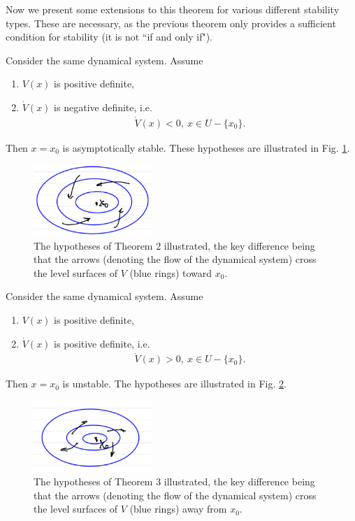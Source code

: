 Now we present some extensions to this theorem for various different stability types. These are necessary, as the previous theorem only provides a sufficient condition for stability (it is not ``if and only if").

\begin{theorem}[Theorem 2]
Consider the same dynamical system. Assume
\begin{enumerate}
	\item $V(x)$ is positive definite,
	\item $\dot{V}(x)$ is negative definite, i.e.
		\begin{align}
			\dot{V}(x) < 0,\ x\in U- \{x_0\}.
		\end{align}
\end{enumerate}
		Then $x=x_0$ is asymptotically stable. These hypotheses are illustrated in Fig. \ref{fig:lyap_thm2_hypos}.
\end{theorem}
\begin{figure}[h!]
	\centering
	\includegraphics[width=0.4\textwidth]{figures/ch2/24lyap_thm2_hypos.png}
	\caption{The hypotheses of Theorem 2 illustrated, the key difference being that the arrows (denoting the flow of the dynamical system) cross the level surfaces of $V$ (blue rings) toward $x_0$.}
	\label{fig:lyap_thm2_hypos}
\end{figure}

\begin{theorem}[Theorem 3]
	Consider the same dynamical system. Assume
	\begin{enumerate}
		\item $V(x)$ is positive definite,
		\item $\dot{V}(x)$ is positive definite, i.e.
		\begin{align}
			\dot{V}(x)>0,\ x\in U- \{x_0\}.
		\end{align}
	\end{enumerate}
	Then $x=x_0$ is unstable. The hypotheses are illustrated in Fig. \ref{fig:lyap_thm3_hypos}.
\end{theorem}

\begin{figure}[h!]
	\centering
	\includegraphics[width=0.4\textwidth]{figures/ch2/25lyap_thm3_hypos.png}
	\caption{The hypotheses of Theorem 3 illustrated, the key difference being that the arrows (denoting the flow of the dynamical system) cross the level surfaces of $V$ (blue rings) away from $x_0$.}
	\label{fig:lyap_thm3_hypos}
\end{figure}

